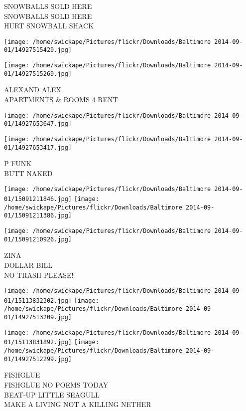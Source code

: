 \documentclass[10pt,letterpaper]{article}
\begin{document}
SNOWBALLS SOLD HERE\\
SNOWBALLS SOLD HERE\\
HURT SNOWBALL SHACK\\
\pagebreak

\texttt{[image: /home/swickape/Pictures/flickr/Downloads/Baltimore 2014-09-01/14927515429.jpg]}

\vspace{0.25in}
\texttt{[image: /home/swickape/Pictures/flickr/Downloads/Baltimore 2014-09-01/14927515269.jpg]}

ALEXAND ALEX\\
APARTMENTS \& ROOMS 4 RENT\\
\pagebreak

\texttt{[image: /home/swickape/Pictures/flickr/Downloads/Baltimore 2014-09-01/14927653647.jpg]}

\vspace{0.25in}
\texttt{[image: /home/swickape/Pictures/flickr/Downloads/Baltimore 2014-09-01/14927653417.jpg]}

P FUNK\\
BUTT NAKED\\
\pagebreak

\texttt{[image: /home/swickape/Pictures/flickr/Downloads/Baltimore 2014-09-01/15091211846.jpg]}
\texttt{[image: /home/swickape/Pictures/flickr/Downloads/Baltimore 2014-09-01/15091211386.jpg]}

\vspace{0.25in}
\texttt{[image: /home/swickape/Pictures/flickr/Downloads/Baltimore 2014-09-01/15091210926.jpg]}

ZINA\\
DOLLAR BILL\\
NO TRASH PLEASE!\\
\pagebreak

\texttt{[image: /home/swickape/Pictures/flickr/Downloads/Baltimore 2014-09-01/15113832302.jpg]}
\texttt{[image: /home/swickape/Pictures/flickr/Downloads/Baltimore 2014-09-01/14927513209.jpg]}

\texttt{[image: /home/swickape/Pictures/flickr/Downloads/Baltimore 2014-09-01/15113831892.jpg]}
\texttt{[image: /home/swickape/Pictures/flickr/Downloads/Baltimore 2014-09-01/14927512299.jpg]}

FISHGLUE\\
FISHGLUE NO POEMS TODAY\\
BEAT{-}UP LITTLE SEAGULL\\
MAKE A LIVING NOT A KILLING NETHER\\
\pagebreak
\end{document}
